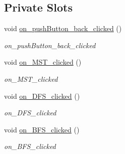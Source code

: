 \subsection*{Private Slots}
\begin{DoxyCompactItemize}
\item 
\mbox{\label{class_admin_extras_popup_accca51b6a634c17ab9c2ca6a8672d49c}} 
void \hyperlink{class_admin_extras_popup_accca51b6a634c17ab9c2ca6a8672d49c}{on\+\_\+push\+Button\+\_\+back\+\_\+clicked} ()
\begin{DoxyCompactList}\small\item\em on\+\_\+push\+Button\+\_\+back\+\_\+clicked \end{DoxyCompactList}\item 
\mbox{\label{class_admin_extras_popup_a74a3bb7f914093a742ede811bb2429a6}} 
void \hyperlink{class_admin_extras_popup_a74a3bb7f914093a742ede811bb2429a6}{on\+\_\+\+M\+S\+T\+\_\+clicked} ()
\begin{DoxyCompactList}\small\item\em on\+\_\+\+M\+S\+T\+\_\+clicked \end{DoxyCompactList}\item 
\mbox{\label{class_admin_extras_popup_aaec3932f3342bd3d26210daa121da49d}} 
void \hyperlink{class_admin_extras_popup_aaec3932f3342bd3d26210daa121da49d}{on\+\_\+\+D\+F\+S\+\_\+clicked} ()
\begin{DoxyCompactList}\small\item\em on\+\_\+\+D\+F\+S\+\_\+clicked \end{DoxyCompactList}\item 
\mbox{\label{class_admin_extras_popup_a255df39be697db72a07c5fc24701b51b}} 
void \hyperlink{class_admin_extras_popup_a255df39be697db72a07c5fc24701b51b}{on\+\_\+\+B\+F\+S\+\_\+clicked} ()
\begin{DoxyCompactList}\small\item\em on\+\_\+\+B\+F\+S\+\_\+clicked \end{DoxyCompactList}\end{DoxyCompactItemize}

